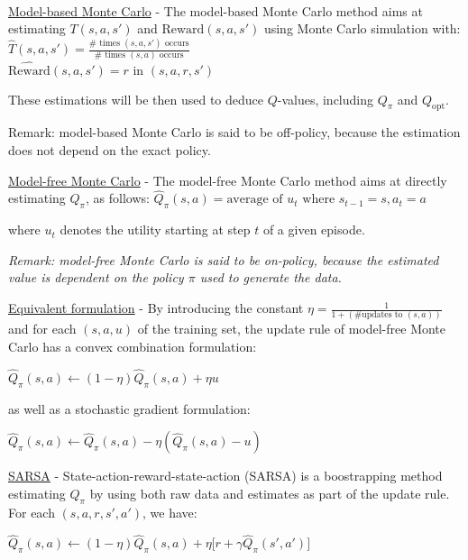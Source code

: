 \documentclass[4pt,landscape]{article}
\begin{document}
\begin{multicols*}{4}
{\color{cyan} \hrulefill}\\
{\tiny \underline{Model-based Monte Carlo} - The model-based Monte Carlo method aims at estimating $T(s,a,s')$ and $\textrm{Reward}(s,a,s')$ using Monte Carlo simulation with:
${\widehat{T}(s,a,s')=\frac{\#\textrm{ times }(s,a,s')\textrm{ occurs}}{\#\textrm{ times }(s,a)\textrm{ occurs}}}$\\
${\widehat{\textrm{Reward}}(s,a,s')=r\textrm{ in }(s,a,r,s')}$

These estimations will be then used to deduce $Q$-values, including $Q_\pi$ and $Q_\textrm{opt}.$}\par
{Remark: model-based Monte Carlo is said to be off-policy, because the estimation does not depend on the exact policy.}\par

{\underline{Model-free Monte Carlo} - The model-free Monte Carlo method aims at directly estimating $Q_{\pi}$, as follows:
${\widehat{Q}_\pi(s,a)=\textrm{average of }u_t\textrm{ where }s_{t-1}=s, a_t=a}$

where $u_t$ denotes the utility starting at step $t$ of a given episode.}\par
{\textit{Remark: model-free Monte Carlo is said to be on-policy, because the estimated value is dependent on the policy $\pi$ used to generate the data.}}\par

{\tiny \underline{Equivalent formulation} - By introducing the constant $\eta=\frac{1}{1+(\#\textrm{updates to }(s,a))}$ and for each $(s,a,u)$ of the training set, the update rule of model-free Monte Carlo has a convex combination formulation:

${\widehat{Q}_\pi(s,a)\leftarrow(1-\eta)\widehat{Q}_\pi(s,a)+\eta u}$

as well as a stochastic gradient formulation:

${\widehat{Q}_\pi(s,a)\leftarrow\widehat{Q}_\pi(s,a) - \eta (\widehat{Q}_\pi(s,a) - u)}$

}\par

{\tiny \underline{SARSA} - State-action-reward-state-action (SARSA) is a boostrapping method estimating $Q_\pi$ by using both raw data and estimates as part of the update rule. For each $(s,a,r,s',a')$, we have:}\par

${\widehat{Q}_\pi(s,a)\longleftarrow(1-\eta)\widehat{Q}_\pi(s,a)+\eta\Big[r+\gamma\widehat{Q}_\pi(s',a')\Big]}$


\end{multicols*}
\end{document}

